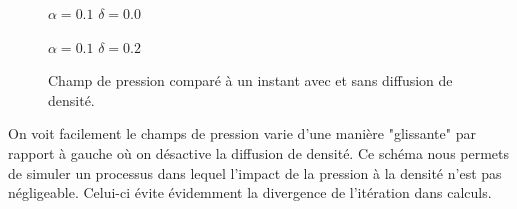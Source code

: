 \documentclass{article}
\begin{document}
\begin{figure}[H]
	\begin{minipage}[H]{0.49\linewidth}
		{$\alpha=0.1$ $\delta=0.0$}
	\end{minipage}
	\hfill
	\begin{minipage}[H]{0.49\linewidth}
		{$\alpha=0.1$ $\delta=0.2$}
	\end{minipage}
	\caption{Champ de pression comparé à un instant avec et sans diffusion de densité.}
\end{figure}
On voit facilement le champs de pression varie d'une manière "glissante" par rapport à gauche où on désactive la diffusion de densité. Ce schéma nous permets de simuler un processus dans lequel l'impact de la pression à la densité n'est pas négligeable. Celui-ci évite évidemment la divergence de l'itération dans calculs.
\end{document}
